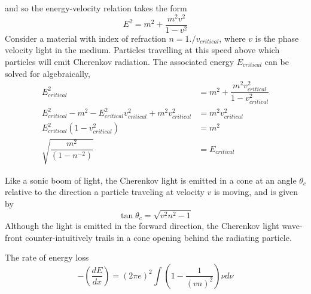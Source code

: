 \documentclass[main.tex]{subfiles}
\begin{document}
and so the energy-velocity relation takes the form 
\begin{equation}
    E^{2} = m^{2} + \dfrac{m^{2}v^{2}}{1-v^{2}}
\end{equation}
Consider a material with index of refraction $n = 1./v_{critical}$, where $v$ is the phase velocity light in the medium. 
Particles travelling at this speed above which particles will emit Cherenkov radiation. 
The associated energy $E_{critical}$ can be solved for algebraically,
\begin{align}
        E^{2}_{critical} &= m^{2} + \dfrac{m^{2}v_{critical}^{2}}{1-v_{critical}^{2}} \\
        E^{2}_{critical}  - m^{2} - E^{2}_{critical}v_{critical}^{2}  + m^{2}v_{critical}^{2} &= m^{2}v_{critical}^{2} \\
        E^{2}_{critical}\left(1  -v_{critical}^{2}\right) &=  m^{2} \\
        \sqrt{\dfrac{m^{2}}{\left(1  -n^{-2}\right)}} &= E_{critical} 
\end{align}

Like a sonic boom of light, the Cherenkov light is emitted in a cone at an angle $\theta_{c}$ relative to the direction a particle traveling at velocity $v$ is moving, and is given by
\begin{equation}
\tan\theta_{c} = \sqrt{v^{2}n^{2} - 1} 
\end{equation}
Although the light is emitted in the forward direction, the Cherenkov light wave-front counter-intuitively trails in a cone opening behind the radiating particle. 

The rate of energy loss 
\begin{equation}
-\left(\dfrac{dE}{dx}\right) =\left(2\pi e\right)^{2}\int \left(1-\dfrac{1}{\left(vn\right)^{2}}\right)\nu d\nu
\end{equation}
\end{document}
